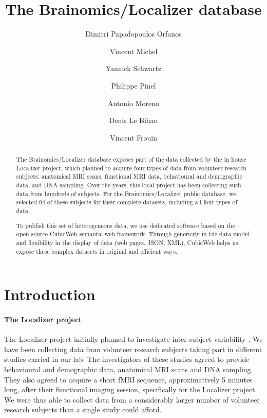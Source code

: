 \documentclass[review]{elsarticle}
\begin{document}
\begin{frontmatter}

\title{The Brainomics/Localizer database}

\author[Neurospin]{Dimitri Papadopoulos Orfanos}
\author[Logilab]{Vincent Michel}
\author[Parietal,Neurospin]{Yannick Schwartz}
\author[U992,Neurospin,ParisSud]{Philippe Pinel}
\author[U992,Neurospin,ParisSud]{Antonio Moreno}
\author[Neurospin]{Denis Le Bihan}
\author[Neurospin]{Vincent Frouin}

\address[Neurospin]{CEA, DSV/I2BM, NeuroSpin, 91191 Gif-sur-Yvette, France}
\address[U992]{INSERM, U992, Cognitive Neuroimaging Unit, 91191 Gif-sur-Yvette, France}
\address[Parietal]{Parietal team, Inria Saclay \^Ile-de-France, 91120 Palaiseau, France}
\address[ParisSud]{Univ. Paris-Sud, Cognitive Neuroimaging Unit, 91191 Gif-sur-Yvette, France}
\address[Logilab]{Logilab, 104 boulevard Auguste Blanqui, 75013 Paris, France}

\begin{abstract}
The Brainomics/Localizer database exposes part of the data collected by the in house Localizer project, which planned to acquire four types of data from volunteer research subjects: anatomical MRI scans, functional MRI data, behavioural and demographic data, and DNA sampling. Over the years, this local project has been collecting such data from hundreds of subjects. For the Brainomics/Localizer public database, we selected 94 of these subjects for their complete datasets, including all four types of data.

To publish this set of heterogeneous data, we use dedicated software based on the open-source CubicWeb semantic web framework. Through genericity in the data model and flexibility in the display of data (web pages, JSON, XML), CubicWeb helps us expose these complex datasets in original and efficient ways.
\end{abstract}

\end{frontmatter}


\section{Introduction}

\paragraph{The Localizer project} The Localizer project initially planned to investigate inter-subject variability \cite{Pinel2007}. We have been collecting data from volunteer research subjects taking part in different studies carried in our lab. The investigators of these studies agreed to provide behavioural and demographic data, anatomical MRI scans and DNA sampling. They also agreed to acquire a short fMRI sequence, approximatively 5 minutes long, after their functional imaging session, specifically for the Localizer project. We were thus able to collect data from a considerably larger number of volunteer research subjects than a single study could afford.
\end{document}
